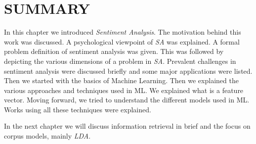 \section*{SUMMARY}

In this chapter we introduced \textit{Sentiment Analysis}. The motivation behind this work was discussed. A psychological viewpoint of 
\textit{SA} was explained. A formal problem definition of sentiment analysis was given. This was followed by depicting the various 
dimensions of a problem in \textit{SA}. Prevalent challenges in sentiment analysis were discussed briefly and some major applications were
listed. Then we started with the basics of Machine Learning. Then we explained the various approaches and techniques used
in ML. We explained what is a feature vector. Moving forward, we tried to understand the different models used in ML. Works using
all these techniques were explained.

In the next chapter we will discuss information retrieval in brief and the focus on corpus models, mainly \textit{LDA}.

\clearpage
